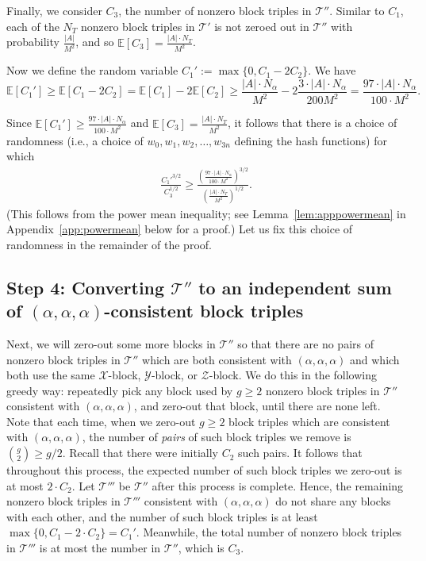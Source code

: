 \PassOptionsToPackage{shortlabels}{enumitem}\documentclass[10pt,a4paper]{article}
\newcommand{\E}{\mathbb{E}}
\newcommand{\T}{\mathcal{T}}
\newcommand{\X}{\mathcal{X}}
\newcommand{\Y}{\mathcal{Y}}
\newcommand{\Z}{\mathcal{Z}}
\begin{document}
Finally, we consider $C_3$, the number of nonzero block triples in $\T''$. Similar to $C_1$, each of the $N_T$ nonzero block triples in $\T'$ is not zeroed out in $\T''$ with probability $\frac{|A|}{M^2}$, and so $\E[C_3] = \frac{|A| \cdot N_T}{M^2}$.



Now we define the random variable $C_1' := \max\{ 0, C_1 - 2 C_2 \}$. We have $$\E[C_1'] \geq \E[C_1 - 2 C_2] = \E[C_1] - 2 \E[C_2] \geq \frac{|A| \cdot N_\alpha}{M^2} - 2 \frac{3 \cdot |A| \cdot N_\alpha}{200 M^2} = \frac{97 \cdot |A| \cdot N_\alpha}{100 \cdot M^2}.$$

Since $\E[C_1'] \geq \frac{97 \cdot |A| \cdot N_\alpha}{100 \cdot M^2}$ and $\E[C_3] = \frac{|A| \cdot N_T}{M^2}$, it follows that there is a choice of randomness (i.e., a choice of $w_0, w_1, w_2, \ldots, w_{3n}$ defining the hash functions) for which \begin{align} \frac{C_1'^{3/2}}{C_3^{1/2}} \geq \frac{\left(\frac{97 \cdot |A| \cdot N_\alpha}{100 \cdot M^2} \right)^{3/2}}{\left( \frac{|A| \cdot N_T}{M^2} \right)^{1/2}}. \end{align} (This follows from the power mean inequality; see Lemma~\ref{lem:apppowermean} in Appendix~\ref{app:powermean} below for a proof.) Let us fix this choice of randomness in the remainder of the proof.


\subsection{Step 4: Converting \texorpdfstring{$\T''$}{T''} to an independent sum of \texorpdfstring{$(\alpha,\alpha,\alpha)$}{(alpha,alpha,alpha)}-consistent block triples}

Next, we will zero-out some more blocks in $\T''$ so that there are no pairs of nonzero block triples in $\T''$ which are both consistent with $(\alpha,\alpha,\alpha)$ and which both use the same $\X$-block, $\Y$-block, or $\Z$-block. We do this in the following greedy way: repeatedly pick any block used by $g \geq 2$ nonzero block triples in $\T''$ consistent with $(\alpha,\alpha,\alpha)$, and zero-out that block, until there are none left. Note that each time, when we zero-out $g \geq 2$ block triples which are consistent with $(\alpha,\alpha,\alpha)$, the number of \emph{pairs} of such block triples we remove is $\binom{g}{2} \geq g/2$. Recall that there were initially $C_2$ such pairs. It follows that throughout this process, the expected number of such block triples we zero-out is at most $2 \cdot C_2$. Let $\T'''$ be $\T''$ after this process is complete. Hence, the remaining nonzero block triples in $\T'''$ consistent with $(\alpha,\alpha,\alpha)$ do not share any blocks with each other, and the number of such block triples is at least $\max\{0, C_1 - 2 \cdot C_2\} = C_1'$.
Meanwhile, the total number of nonzero block triples in $\T'''$ is at most the number in $\T''$, which is $C_3$. 
\end{document}
